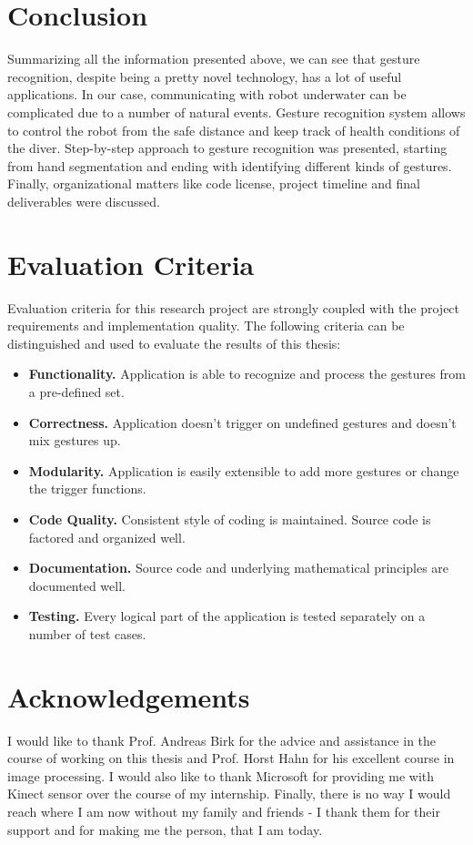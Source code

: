 \documentclass[a4paper,11pt,oneside]{article}
\begin{document}
  \section{Conclusion}

  Summarizing all the information presented above, we can see that gesture recognition, despite being a pretty novel technology, has a lot of useful applications. In our case, communicating with robot underwater can be complicated due to a number of natural events. Gesture recognition system allows to control the robot from the safe distance and keep track of health conditions of the diver. Step-by-step approach to gesture recognition was presented, starting from hand segmentation and ending with identifying different kinds of gestures. Finally, organizational matters like code license, project timeline and final deliverables were discussed.
  
  \section{Evaluation Criteria}
  
  Evaluation criteria for this research project are strongly coupled with the project requirements and implementation quality. The following criteria can be distinguished and used to evaluate the results of this thesis:
  
  \begin{itemize}
  \item \textbf{Functionality.} Application is able to recognize and process the gestures from a pre-defined set. 
  \item \textbf{Correctness.} Application doesn't trigger on undefined gestures and doesn't mix gestures up.
   \item \textbf{Modularity.} Application is easily extensible to add more gestures or change the trigger functions. 
  \item \textbf{Code Quality.} Consistent style of coding is maintained. Source code is factored and organized well.
  \item \textbf{Documentation.} Source code and underlying mathematical principles are documented well.
  \item \textbf{Testing.} Every logical part of the application is tested separately on a number of test cases. 
  \end{itemize}
  
  \section{Acknowledgements}
  I would like to thank Prof. Andreas Birk for the advice and assistance in the course of working on this thesis and Prof. Horst Hahn for his excellent course in image processing. I would also like to thank Microsoft for providing me with Kinect sensor over the course of my internship. Finally, there is no way I would reach where I am now without my family and friends - I thank them for their support and for making me the person, that I am today.

  \newpage
  \renewcommand{\refname}{\section{References}}
  
  
  
\end{document}
